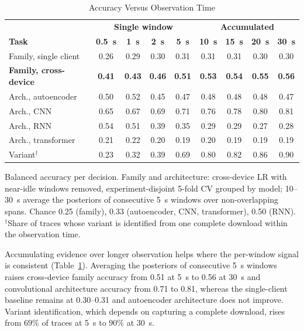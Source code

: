 \documentclass[conference]{IEEEtran}
\begin{document}
\begin{table}[!htbp]
\centering
\caption{Accuracy Versus Observation Time}
\label{tab:window_results}
\scriptsize
\renewcommand{\arraystretch}{1.08}
\setlength{\tabcolsep}{2pt}
\begin{tabular}{lcccc|cccc}
\hline
& \multicolumn{4}{c|}{\textbf{Single window}} & \multicolumn{4}{c}{\textbf{Accumulated}} \\
\textbf{Task} & \textbf{0.5~s} & \textbf{1~s} & \textbf{2~s} & \textbf{5~s} & \textbf{10~s} & \textbf{15~s} & \textbf{20~s} & \textbf{30~s} \\
\hline
Family, single client     & 0.26 & 0.29 & 0.30 & 0.31 & 0.31 & 0.31 & 0.30 & 0.30 \\
\textbf{Family, cross-device} & \textbf{0.41} & \textbf{0.43} & \textbf{0.46} & \textbf{0.51} & \textbf{0.53} & \textbf{0.54} & \textbf{0.55} & \textbf{0.56} \\
\hline
Arch., autoencoder         & 0.50 & 0.52 & 0.45 & 0.47 & 0.48 & 0.48 & 0.48 & 0.47 \\
Arch., CNN                 & 0.65 & 0.67 & 0.69 & 0.71 & 0.76 & 0.78 & 0.80 & 0.81 \\
Arch., RNN                 & 0.54 & 0.51 & 0.39 & 0.35 & 0.29 & 0.29 & 0.27 & 0.28 \\
Arch., transformer         & 0.21 & 0.22 & 0.20 & 0.19 & 0.20 & 0.19 & 0.19 & 0.19 \\
\hline
Variant$^{\dagger}$        & 0.23 & 0.32 & 0.39 & 0.69 & 0.80 & 0.82 & 0.86 & 0.90 \\
\hline
\end{tabular}

\vspace{2pt}
\parbox{0.95\columnwidth}{\scriptsize Balanced accuracy per decision. Family and
architecture: cross-device LR with near-idle windows removed, experiment-disjoint
5-fold CV grouped by model; 10--30~s average the posteriors of consecutive 5~s
windows over non-overlapping spans. Chance 0.25 (family), 0.33 (autoencoder,
CNN, transformer), 0.50 (RNN). $^{\dagger}$Share of traces whose variant is
identified from one complete download within the observation time.}
\end{table}

Accumulating evidence over longer observation helps where the per-window signal
is consistent (Table~\ref{tab:window_results}). Averaging the posteriors of
consecutive 5~s windows raises cross-device family accuracy from 0.51 at 5~s to
0.56 at 30~s and convolutional architecture accuracy from 0.71 to 0.81, whereas
the single-client baseline remains at 0.30--0.31 and autoencoder architecture
does not improve. Variant identification, which depends on capturing a complete
download, rises from $69\%$ of traces at 5~s to $90\%$ at 30~s.
\end{document}
